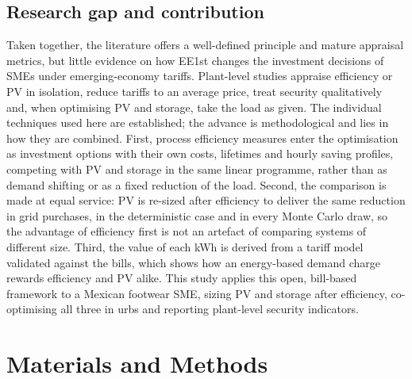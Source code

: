\documentclass[processes,article,submit,pdftex,moreauthors]{Definitions/mdpi}
\begin{document}
\subsection{Research gap and contribution}
Taken together, the literature offers a well-defined principle and mature appraisal metrics, but little evidence on how EE1st changes the investment decisions of SMEs under emerging-economy tariffs. Plant-level studies appraise efficiency or PV in isolation, reduce tariffs to an average price, treat security qualitatively and, when optimising PV and storage, take the load as given. The individual techniques used here are established; the advance is methodological and lies in how they are combined. First, process efficiency measures enter the optimisation as investment options with their own costs, lifetimes and hourly saving profiles, competing with PV and storage in the same linear programme, rather than as demand shifting or as a fixed reduction of the load. Second, the comparison is made at equal service: PV is re-sized after efficiency to deliver the same reduction in grid purchases, in the deterministic case and in every Monte Carlo draw, so the advantage of efficiency first is not an artefact of comparing systems of different size. Third, the value of each kWh is derived from a tariff model validated against the bills, which shows how an energy-based demand charge rewards efficiency and PV alike. This study applies this open, bill-based framework to a Mexican footwear SME, sizing PV and storage after efficiency, co-optimising all three in urbs and reporting plant-level security indicators.

\section{Materials and Methods}
\label{sec:method}
\end{document}
